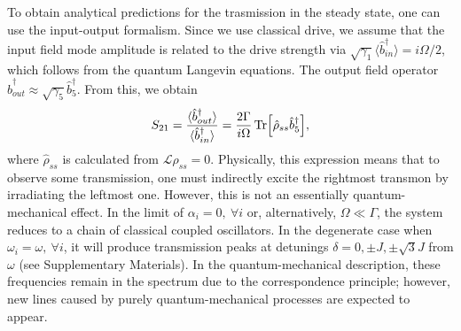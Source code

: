 \documentclass[%
 aps, prl,
 amsmath,amssymb,
 reprint,%
superscriptaddress
]{revtex4-2}
\begin{document}
To obtain analytical predictions for the trasmission in the steady state, one can use the input-output formalism. Since we use classical drive, we assume that the input field mode amplitude is related to the drive strength via $\sqrt{\gamma_1} \langle  \hat b_{in}^\dag \rangle = i \Omega/2$, which follows from the quantum Langevin equations. The output field operator $\hat b_{out}^\dag \approx \sqrt{\gamma_5} \hat b_5^\dag$. From this, we obtain
\begin{equation}
	S_{21} = \frac{\langle \hat b_{out}^\dag \rangle}{\langle \hat b_{in}^\dag \rangle} = \frac{2\Gamma }{i\Omega} \Tr[\hat \rho_{ss} \hat b_5^\dag],
\end{equation}
where $\hat \rho_{ss}$ is calculated from $\mathcal L \rho_{ss} = 0$. Physically, this expression means that to observe some transmission, one must indirectly excite the rightmost transmon by irradiating the leftmost one. However, this is not an essentially quantum-mechanical effect. In the limit of $\alpha_i = 0,\ \forall i$ or, alternatively, $\Omega \ll \Gamma$, the system reduces to a chain of classical coupled oscillators. In the degenerate case when $\omega_i = \omega,\ \forall i$, it will produce transmission peaks at detunings $\delta = 0, \pm J, \pm \sqrt{3} J$ from $\omega$ (see Supplementary Materials). In the quantum-mechanical description, these frequencies remain in the spectrum due to the correspondence principle; however, new lines caused by purely quantum-mechanical processes are expected to appear.
\end{document}
